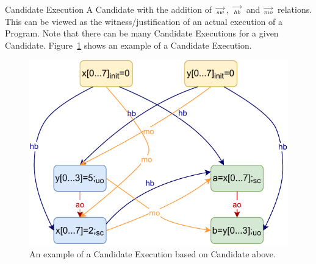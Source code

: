     \begin{definition}{Candidate Execution}
        A Candidate with the addition of $\stackrel{\longrightarrow}{_\textit{sw}}$, $\stackrel{\longrightarrow}{_\textit{hb}}$ and $\stackrel{\longrightarrow}{_\textit{mo}}$ relations. 
        This can be viewed as the witness/justification of an actual execution of a Program. 
        Note that there can be many Candidate Executions for a given Candidate. 
        Figure~\ref{model:candexec} shows an example of a Candidate Execution.  
        \begin{figure}[H]
            \centering
            \includegraphics[scale=0.7]{3.ECMAScriptMemoryModel/CandidateExecution.pdf}
            \caption{An example of a Candidate Execution based on Candidate above.}
            \label{model:candexec}
        \end{figure}
        
    \end{definition}

